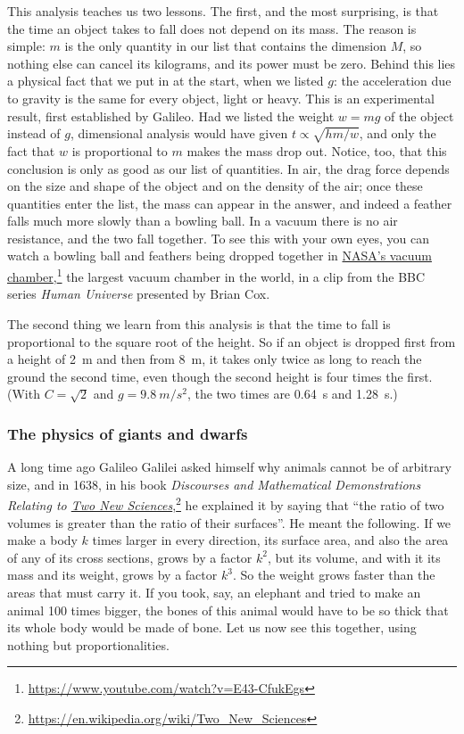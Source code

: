 \documentclass[11pt,a4paper]{article}
\begin{document}
This analysis teaches us two lessons. The first, and the most surprising, is that the time an
object takes to fall does not depend on its mass. The reason is simple: $m$ is the only quantity in
our list that contains the dimension $M$, so nothing else can cancel its kilograms, and its power
must be zero. Behind this lies a physical fact that we put in at the start, when we listed $g$:
the acceleration due to gravity is the same for every object, light or heavy. This is an
experimental result, first established by Galileo. Had we listed the weight $w = mg$ of the object
instead of $g$, dimensional analysis would have given $t \propto \sqrt{hm/w}$, and only the fact
that $w$ is proportional to $m$ makes the mass drop out. Notice, too, that this conclusion is only
as good as our list of quantities. In
air, the drag force depends on the size and shape of the object and on the density of the air;
once these quantities enter the list, the mass can appear in the answer, and indeed a feather falls
much more slowly than a bowling ball. In a vacuum there is no air resistance, and the two fall
together. To see this with your own eyes, you can watch a bowling ball and feathers being dropped
together in \href{https://www.youtube.com/watch?v=E43-CfukEgs}{NASA's vacuum
chamber},\footnote{\url{https://www.youtube.com/watch?v=E43-CfukEgs}} the largest vacuum chamber
in the world, in a clip from the BBC series \emph{Human Universe} presented by Brian Cox.

The second thing we learn from this analysis is that the time to fall is proportional to the square
root of the height. So if an object is dropped first from a height of \qty{2}{m} and then from
\qty{8}{m}, it takes only twice as long to reach the ground the second time, even though the second
height is four times the first. (With $C = \sqrt{2}$ and $g = \qty{9.8}{m/s^2}$, the two times are
\qty{0.64}{s} and \qty{1.28}{s}.)

\subsubsection{The physics of giants and dwarfs}

A long time ago Galileo Galilei asked himself why animals cannot be of arbitrary size, and in 1638,
in his book \emph{Discourses and Mathematical Demonstrations Relating to
\href{https://en.wikipedia.org/wiki/Two_New_Sciences}{Two New
Sciences}},\footnote{\url{https://en.wikipedia.org/wiki/Two_New_Sciences}} he explained it by
saying that ``the ratio of two volumes is greater than the ratio of their surfaces''. He meant the
following. If we make a body $k$ times larger in every direction, its surface area, and also the
area of any of its cross sections, grows by a factor $k^2$, but its volume, and with it its mass
and its weight, grows by a factor $k^3$. So the weight grows faster than the areas that must carry
it. If you took, say, an elephant and tried to make an animal 100 times bigger, the bones of this
animal would have to be so thick that its whole body would be made of bone. Let us now see this
together, using nothing but proportionalities.
\end{document}
